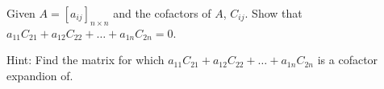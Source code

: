 
\begin{Exercise}[
name={},
title={}, 
difficulty=0,
origin={\cite{YL}}]
Given $A=[a_{ij}]_{n\times n}$ and the cofactors of $A$, $C_{ij}$. Show that $a_{11}C_{21} + a_{12}C_{22} + \ldots + a_{1n}C_{2n}=0$.
\end{Exercise}

\begin{Answer}
Hint: Find the matrix for which $a_{11}C_{21} + a_{12}C_{22} + \ldots + a_{1n}C_{2n}$ is a cofactor expandion of.
\end{Answer}

